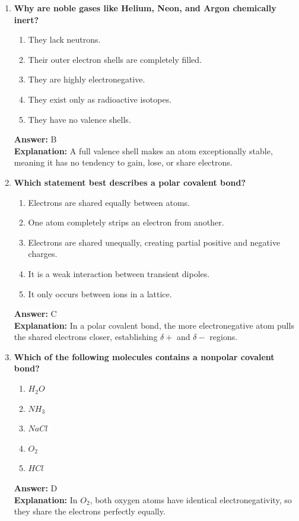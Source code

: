 \documentclass[11pt, a4paper]{article}
\begin{document}
\begin{enumerate}
\item \textbf{Why are noble gases like Helium, Neon, and Argon chemically inert?}
\begin{enumerate}[label=\Alph*.]
    \item They lack neutrons.
    \item Their outer electron shells are completely filled.
    \item They are highly electronegative.
    \item They exist only as radioactive isotopes.
    \item They have no valence shells.
\end{enumerate}
\textbf{Answer:} B \\
\textbf{Explanation:} A full valence shell makes an atom exceptionally stable, meaning it has no tendency to gain, lose, or share electrons.

\item \textbf{Which statement best describes a polar covalent bond?}
\begin{enumerate}[label=\Alph*.]
    \item Electrons are shared equally between atoms.
    \item One atom completely strips an electron from another.
    \item Electrons are shared unequally, creating partial positive and negative charges.
    \item It is a weak interaction between transient dipoles.
    \item It only occurs between ions in a lattice.
\end{enumerate}
\textbf{Answer:} C \\
\textbf{Explanation:} In a polar covalent bond, the more electronegative atom pulls the shared electrons closer, establishing $\delta+$ and $\delta-$ regions.

\item \textbf{Which of the following molecules contains a nonpolar covalent bond?}
\begin{enumerate}[label=\Alph*.]
    \item $H_2O$
    \item $NH_3$
    \item $NaCl$
    \item $O_2$
    \item $HCl$
\end{enumerate}
\textbf{Answer:} D \\
\textbf{Explanation:} In $O_2$, both oxygen atoms have identical electronegativity, so they share the electrons perfectly equally.


\end{enumerate}
\end{document}
